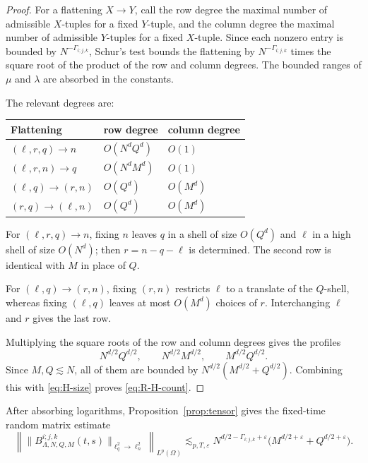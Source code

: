 \documentclass[11pt,reqno]{amsart}
\numberwithin{equation}{section}
\theoremstyle{plain}
\theoremstyle{definition}
\newcommand{\eps}{\varepsilon}
\begin{document}
\begin{proof}
For a flattening \(X\to Y\), call the row degree the maximal number of admissible \(X\)-tuples for a fixed \(Y\)-tuple, and the column degree the maximal number of admissible \(Y\)-tuples for a fixed \(X\)-tuple.  Since each nonzero entry is bounded by \(N^{-\Gamma_{i;j,k}}\), Schur's test bounds the flattening by \(N^{-\Gamma_{i;j,k}}\) times the square root of the product of the row and column degrees.  The bounded ranges of \(\mu\) and \(\lambda\) are absorbed in the constants.

The relevant degrees are:
\begin{center}
\begin{tabular}{lll}
\toprule
Flattening & row degree & column degree\\
\midrule
\((\ell,r,q)\to n\) & \(O(N^dQ^d)\) & \(O(1)\)\\
\((\ell,r,n)\to q\) & \(O(N^dM^d)\) & \(O(1)\)\\
\((\ell,q)\to(r,n)\) & \(O(Q^d)\) & \(O(M^d)\)\\
\((r,q)\to(\ell,n)\) & \(O(Q^d)\) & \(O(M^d)\)\\
\bottomrule
\end{tabular}
\end{center}

For \((\ell,r,q)\to n\), fixing \(n\) leaves \(q\) in a shell of
size \(O(Q^d)\) and \(\ell\) in a high shell of size \(O(N^d)\); then
\(r=n-q-\ell\) is determined.  The second row is identical with \(M\) in
place of \(Q\).

For \((\ell,q)\to(r,n)\), fixing \((r,n)\) restricts \(\ell\) to a
translate of the \(Q\)-shell, whereas fixing \((\ell,q)\) leaves at most
\(O(M^d)\) choices of \(r\).  Interchanging \(\ell\) and \(r\) gives the
last row.

Multiplying the square roots of the row and column degrees gives the profiles
\[
        N^{d/2}Q^{d/2},\qquad
        N^{d/2}M^{d/2},\qquad
        M^{d/2}Q^{d/2}.
\]
Since \(M,Q\lesssim N\), all of them are bounded by \(N^{d/2}(M^{d/2}+Q^{d/2})\).  Combining this with \eqref{eq:H-size} proves \eqref{eq:R-H-count}.
\end{proof}

After absorbing logarithms, Proposition~\ref{prop:tensor} gives the fixed-time random matrix estimate
\begin{equation}\label{eq:fixed-time-B}
        \left\|\|B_{\Lambda,N,Q,M}^{i;j,k}(t,s)\|_{\ell^2_q\to\ell^2_n}\right\|_{L^p(\Omega)}
        \lesssim_{p,T,\eps}
        N^{d/2-\Gamma_{i;j,k}+\eps}\bigl(M^{d/2+\eps}+Q^{d/2+\eps}\bigr).
\end{equation}
\end{document}
